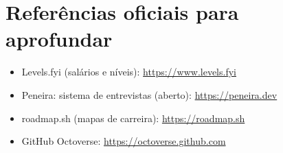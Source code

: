 \section{Referências oficiais para aprofundar}

\begin{itemize}[leftmargin=*, itemsep=0.3em]
  \item Levels.fyi (salários e níveis): \url{https://www.levels.fyi}
  \item Peneira: sistema de entrevistas (aberto): \url{https://peneira.dev}
  \item roadmap.sh (mapas de carreira): \url{https://roadmap.sh}
  \item GitHub Octoverse: \url{https://octoverse.github.com}
\end{itemize}
